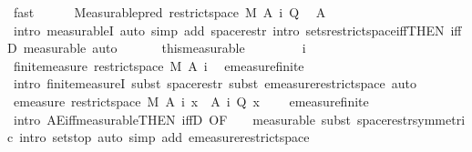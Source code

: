 \begin{isabellebody}
\ fast\isanewline
\ \ \ \ \isamarkupfalse%
\ {\isachardoublequoteopen}Measurable{\isachardot}{\kern0pt}pred\ {\isacharparenleft}{\kern0pt}restrict{\isacharunderscore}{\kern0pt}space\ M\ {\isacharparenleft}{\kern0pt}A\ i{\isacharparenright}{\kern0pt}{\isacharparenright}{\kern0pt}\ Q{\isachardoublequoteclose}\ \isamarkupfalse%
\ A\ \isamarkupfalse%
\ {\isacharparenleft}{\kern0pt}intro\ measurableI{\isacharcomma}{\kern0pt}\ auto\ simp\ add{\isacharcolon}{\kern0pt}\ space{\isacharunderscore}{\kern0pt}restr\ intro{\isacharbang}{\kern0pt}{\isacharcolon}{\kern0pt}\ sets{\isacharunderscore}{\kern0pt}restrict{\isacharunderscore}{\kern0pt}space{\isacharunderscore}{\kern0pt}iff{\isacharbrackleft}{\kern0pt}THEN\ iffD{}{\isacharbrackright}{\kern0pt}{\isacharcomma}{\kern0pt}\ measurable{\isacharcomma}{\kern0pt}\ auto{\isacharparenright}{\kern0pt}\isanewline
\ \ \isacommand{{\isacharbraceright}{\kern0pt}}\isamarkupfalse%
\isanewline
\ \ \isamarkupfalse%
\ this{\isacharbrackleft}{\kern0pt}measurable{\isacharbrackright}{\kern0pt}\isanewline
\ \ \isacommand{{\isacharbraceleft}{\kern0pt}}\isamarkupfalse%
\isanewline
\ \ \ \ \isamarkupfalse%
\ i\isanewline
\ \ \ \ \isamarkupfalse%
\ {\isachardoublequoteopen}finite{\isacharunderscore}{\kern0pt}measure\ {\isacharparenleft}{\kern0pt}restrict{\isacharunderscore}{\kern0pt}space\ M\ {\isacharparenleft}{\kern0pt}A\ i{\isacharparenright}{\kern0pt}{\isacharparenright}{\kern0pt}{\isachardoublequoteclose}\ \isamarkupfalse%
\ emeasure{\isacharunderscore}{\kern0pt}finite\ \isamarkupfalse%
\ {\isacharparenleft}{\kern0pt}intro\ finite{\isacharunderscore}{\kern0pt}measureI{\isacharcomma}{\kern0pt}\ subst\ space{\isacharunderscore}{\kern0pt}restr{\isacharcomma}{\kern0pt}\ subst\ emeasure{\isacharunderscore}{\kern0pt}restrict{\isacharunderscore}{\kern0pt}space{\isacharcomma}{\kern0pt}\ auto{\isacharparenright}{\kern0pt}\isanewline
\ \ \ \ \isamarkupfalse%
\ {\isachardoublequoteopen}emeasure\ {\isacharparenleft}{\kern0pt}restrict{\isacharunderscore}{\kern0pt}space\ M\ {\isacharparenleft}{\kern0pt}A\ i{\isacharparenright}{\kern0pt}{\isacharparenright}{\kern0pt}\ {\isacharbraceleft}{\kern0pt}x\ {\isasymin}\ A\ i{\isachardot}{\kern0pt}\ {\isasymnot}Q\ x{\isacharbraceright}{\kern0pt}\ {\isacharequal}{\kern0pt}\ {}{\isachardoublequoteclose}\ \isamarkupfalse%
\ emeasure{\isacharunderscore}{\kern0pt}finite\ \isamarkupfalse%
\ {\isacharparenleft}{\kern0pt}intro\ AE{\isacharunderscore}{\kern0pt}iff{\isacharunderscore}{\kern0pt}measurable{\isacharbrackleft}{\kern0pt}THEN\ iffD{}{\isacharcomma}{\kern0pt}\ OF\ {\isacharunderscore}{\kern0pt}\ {\isacharunderscore}{\kern0pt}\ {\isacharasterisk}{\kern0pt}{\isacharbrackright}{\kern0pt}{\isacharcomma}{\kern0pt}\ measurable{\isacharcomma}{\kern0pt}\ subst\ space{\isacharunderscore}{\kern0pt}restr{\isacharbrackleft}{\kern0pt}symmetric{\isacharbrackright}{\kern0pt}{\isacharcomma}{\kern0pt}\ intro\ sets{\isachardot}{\kern0pt}top{\isacharcomma}{\kern0pt}\ auto\ simp\ add{\isacharcolon}{\kern0pt}\ emeasure{\isacharunderscore}{\kern0pt}restrict{\isacharunderscore}{\kern0pt}space{\isacharparenright}{\kern0pt}\isanewline

\end{isabellebody}
